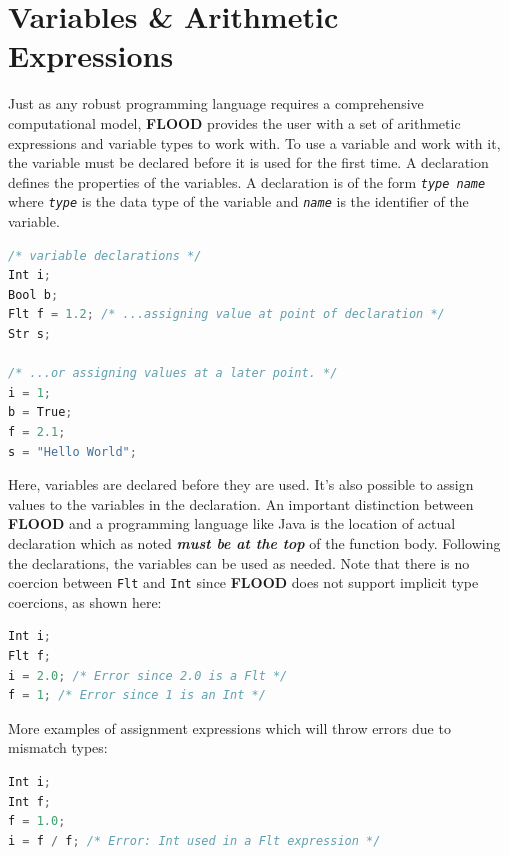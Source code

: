 \documentclass[12pt]{report}
\begin{document}
\section{Variables \& Arithmetic Expressions}

Just as any robust programming language requires a comprehensive computational model, \textbf{FLOOD} provides the user with a set of arithmetic expressions and variable types to work with. To use a variable and work with it, the variable must be declared before it is used for the first time. A declaration defines the properties of the variables. A declaration is of the form \textit{\texttt{type name}} where \textit{\texttt{type}} is the data type of the variable and \textit{\texttt{name}} is the identifier of the variable.

\begin{singlespace}
\begin{lstlisting}[language=Java,label=some-code,caption=Variable declarations]
/* variable declarations */
Int i;
Bool b;
Flt f = 1.2; /* ...assigning value at point of declaration */
Str s;

/* ...or assigning values at a later point. */
i = 1;
b = True;
f = 2.1;
s = "Hello World";
\end{lstlisting}
\end{singlespace}

Here, variables are declared before they are used. It's also possible to assign values to the variables in the declaration. An important distinction between \textbf{FLOOD} and a programming language like Java is the location of actual declaration which as noted \textit{\textbf{must be at the top}} of the function body. Following the declarations, the variables can be used as needed. Note that there is no coercion between \texttt{Flt} and \texttt{Int} since \textbf{FLOOD} does not support implicit type coercions, as shown here:

\begin{singlespace}
\begin{lstlisting}[language=Java,label=some-code,caption=Implicit type coersion is not supported]
Int i;
Flt f;
i = 2.0; /* Error since 2.0 is a Flt */
f = 1; /* Error since 1 is an Int */
\end{lstlisting}
\end{singlespace}

More examples of assignment expressions which will throw errors due to mismatch types:

\begin{singlespace}
\begin{lstlisting}[language=Java,label=some-code,caption=More errors due to mistmatch type declarations and assignments]
Int i;
Int f;
f = 1.0;
i = f / f; /* Error: Int used in a Flt expression */
\end{lstlisting}
\end{singlespace}
\end{document}

